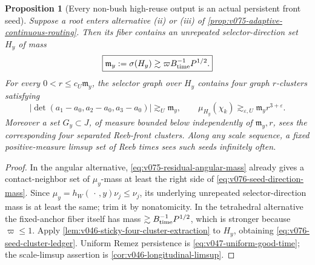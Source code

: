 \documentclass[10pt]{article}
\newtheorem{proposition}[theorem]{Proposition}
\begin{document}
\begin{proposition}[Every non-bush high-reuse output is an actual persistent front seed]
\label{prop:v076-high-reuse-seed-promotion}
Suppose a root enters alternative \textnormal{(ii)} or \textnormal{(iii)} of
\cref{prop:v075-adaptive-continuous-routing}.  Then its fiber contains an unrepeated
selector-direction set \(H_y\) of mass
\begin{equation}
\label{eq:v076-seed-direction-mass}
\boxed{
\mathfrak m_y:=\sigma(H_y)
\gtrsim
\varpi B_{\rm time}^{-1}P^{1/2}.
}
\end{equation}
For every \(0<r\le c_U\mathfrak m_y\), the selector graph over \(H_y\) contains four graph
\(r\)-clusters satisfying
\begin{equation}
\label{eq:v076-seed-cluster-ledger}
\boxed{
|\det(a_1-a_0,a_2-a_0,a_3-a_0)|
\gtrsim_U\mathfrak m_y,
\qquad
\mu_{H_y}(\chi_k)
\gtrsim_{\varepsilon,U}
\mathfrak m_y r^{3+\varepsilon}.
}
\end{equation}
Moreover a set \(G_y\subset J\), of measure bounded below independently of
\(\mathfrak m_y,r\), sees the corresponding four separated Reeb-front clusters.  Along any scale
sequence, a fixed positive-measure limsup set of Reeb times sees such seeds infinitely often.
\end{proposition}

\begin{proof}
In the angular alternative,
\eqref{eq:v075-residual-angular-mass} already gives a contact-neighbor set of
\(\mu_y\)-mass at least the right side of \eqref{eq:v076-seed-direction-mass}.  Since
\(\mu_y=h_W(\,\cdot\,,y)\nu_j\le\nu_j\), its underlying unrepeated selector-direction mass is at
least the same; trim it by nonatomicity.  In the tetrahedral alternative the fixed-anchor fiber
itself has mass \(\gtrsim B_{\rm time}^{-1}P^{1/2}\), which is stronger because
\(\varpi\le1\).  Apply
\cref{lem:v046-sticky-four-cluster-extraction} to \(H_y\), obtaining
\eqref{eq:v076-seed-cluster-ledger}.  Uniform Remez persistence is
\eqref{eq:v047-uniform-good-time}; the scale-limsup assertion is
\cref{cor:v046-longitudinal-limsup}.
\end{proof}
\end{document}
